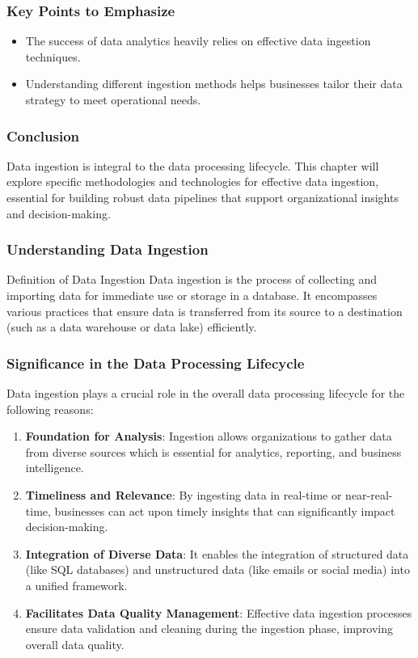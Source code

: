 \documentclass{beamer}
\begin{document}
\begin{frame}[fragile]
    \frametitle{Key Points to Emphasize}
    \begin{itemize}
        \item The success of data analytics heavily relies on effective data ingestion techniques.
        \item Understanding different ingestion methods helps businesses tailor their data strategy to meet operational needs.
    \end{itemize}
\end{frame}

\begin{frame}[fragile]
    \frametitle{Conclusion}
    Data ingestion is integral to the data processing lifecycle. This chapter will explore specific methodologies and technologies for effective data ingestion, essential for building robust data pipelines that support organizational insights and decision-making.
\end{frame}

\begin{frame}[fragile]
    \frametitle{Understanding Data Ingestion}
    \begin{block}{Definition of Data Ingestion}
        Data ingestion is the process of collecting and importing data for immediate use or storage in a database. It encompasses various practices that ensure data is transferred from its source to a destination (such as a data warehouse or data lake) efficiently.
    \end{block}
\end{frame}

\begin{frame}[fragile]
    \frametitle{Significance in the Data Processing Lifecycle}
    Data ingestion plays a crucial role in the overall data processing lifecycle for the following reasons:
    
    \begin{enumerate}
        \item \textbf{Foundation for Analysis}: Ingestion allows organizations to gather data from diverse sources which is essential for analytics, reporting, and business intelligence.
        
        \item \textbf{Timeliness and Relevance}: By ingesting data in real-time or near-real-time, businesses can act upon timely insights that can significantly impact decision-making.
        
        \item \textbf{Integration of Diverse Data}: It enables the integration of structured data (like SQL databases) and unstructured data (like emails or social media) into a unified framework.
        
        \item \textbf{Facilitates Data Quality Management}: Effective data ingestion processes ensure data validation and cleaning during the ingestion phase, improving overall data quality.
    \end{enumerate}
\end{frame}
\end{document}
